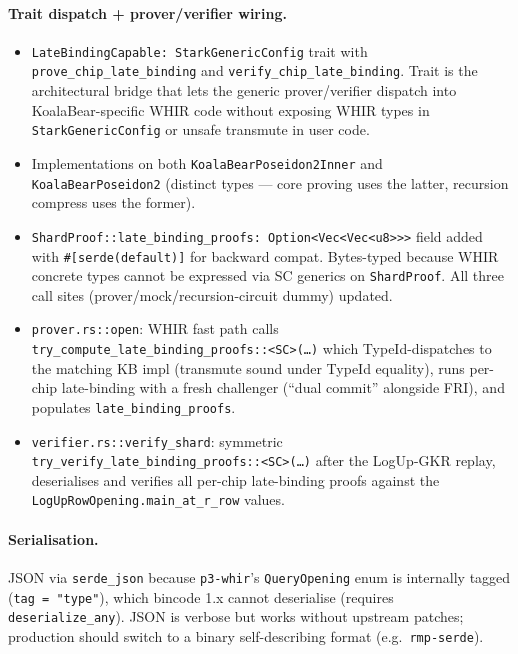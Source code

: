 \paragraph{Trait dispatch + prover/verifier wiring.}
\begin{itemize}
  \item \texttt{LateBindingCapable: StarkGenericConfig} trait with
        \texttt{prove\_chip\_late\_binding} and
        \texttt{verify\_chip\_late\_binding}.  Trait is the
        architectural bridge that lets the generic prover/verifier
        dispatch into KoalaBear-specific WHIR code without exposing
        WHIR types in \texttt{StarkGenericConfig} or unsafe transmute
        in user code.
  \item Implementations on both \texttt{KoalaBearPoseidon2Inner} and
        \texttt{KoalaBearPoseidon2} (distinct types --- core proving
        uses the latter, recursion compress uses the former).
  \item \texttt{ShardProof::late\_binding\_proofs:
        Option<Vec<Vec<u8>>>} field added with
        \texttt{\#[serde(default)]} for backward compat.  Bytes-typed
        because WHIR concrete types cannot be expressed via SC
        generics on \texttt{ShardProof}.  All three call sites
        (prover/mock/recursion-circuit dummy) updated.
  \item \texttt{prover.rs::open}: WHIR fast path calls
        \texttt{try\_compute\_late\_binding\_proofs::<SC>(\ldots)}
        which TypeId-dispatches to the matching KB impl (transmute
        sound under TypeId equality), runs per-chip late-binding with
        a fresh challenger (``dual commit'' alongside FRI), and
        populates \texttt{late\_binding\_proofs}.
  \item \texttt{verifier.rs::verify\_shard}: symmetric
        \texttt{try\_verify\_late\_binding\_proofs::<SC>(\ldots)} after
        the LogUp-GKR replay, deserialises and verifies all per-chip
        late-binding proofs against the
        \texttt{LogUpRowOpening.main\_at\_r\_row} values.
\end{itemize}

\paragraph{Serialisation.}
JSON via \texttt{serde\_json} because \texttt{p3-whir}'s
\texttt{QueryOpening} enum is internally tagged
(\texttt{tag = "type"}), which bincode 1.x cannot deserialise
(requires \texttt{deserialize\_any}).  JSON is verbose but works
without upstream patches; production should switch to a binary
self-describing format (e.g.~\texttt{rmp-serde}).

